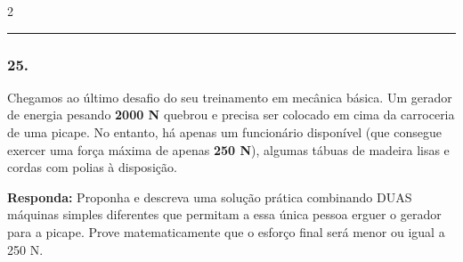 \documentclass[twoside, 10pt, a4paper]{article}
\newlength{\espacoPreQuestao}
\newlength{\espacoQuestao}
\begin{document}
\begin{multicols*}{2}
\noindent\textcolor{CorLinha}{\rule{\linewidth}{0.5pt}} 
\par\vspace{\espacoPreQuestao}
\subsubsection*{25.} Chegamos ao último desafio do seu treinamento em mecânica básica. Um gerador de energia pesando \textbf{2000 N} quebrou e precisa ser colocado em cima da carroceria de uma picape. No entanto, há apenas um funcionário disponível (que consegue exercer uma força máxima de apenas \textbf{250 N}), algumas tábuas de madeira lisas e cordas com polias à disposição.
\begin{boxresponda}
\textbf{Responda:} Proponha e descreva uma solução prática combinando DUAS máquinas simples diferentes que permitam a essa única pessoa erguer o gerador para a picape. Prove matematicamente que o esforço final será menor ou igual a 250 N.
\end{boxresponda}
\par\vspace{\espacoQuestao}

\end{multicols*}
\end{document}
